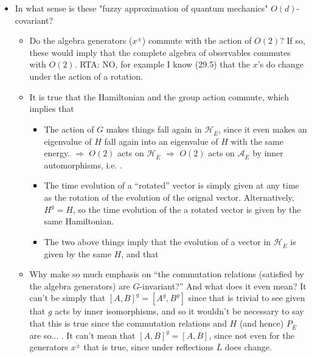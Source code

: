 \documentclass{article}
\newcommand{\cut}[1]{\overline{#1}}
\begin{document}
    \begin{itemize}

    \item In what sense is these "fuzzy approximation of quantum mechanics" $O(d)$-covariant?
    
        \begin{itemize}
            
        \item Do the algebra generators ($x^\pm$) commute with the action of $O(2)$? If so, these would imply that the complete algebra of observables commutes with $O(2)$. RTA: NO, for example I know (29.5) that the $x$'s do change under the action of a rotation.
        
        \item {} It is true that the Hamiltonian and the group action commute, which implies that
        
            \begin{itemize}
                
            \item The action of $G$ makes things fall again in $\mathcal H_{\cut E}$, since it even makes an eigenvalue of $H$ fall again into an eigenvalue of $H$ with the same energy.
$\Rightarrow$ $O(2)$ acts on $\mathcal H_{\cut E}$ $\Rightarrow$ $O(2)$ acts on $\mathcal A_{\cut E}$ by inner automorphisms, i.e. .         
            \item The time evolution of a ``rotated'' vector is simply given at any time as the rotation of the evolution of the orignal vector. Alternatively, $H^g = H$, so the time evolution of the a rotated vector is given by the same Hamiltonian.
            
            \item The two above things imply that the evolution of a vector in $\mathcal H_{\cut E}$ is given by the same $H$, and that 
            
                
            \end{itemize}
            
        \item Why make so much emphasis on ``the commutation relations (satisfied by the algebra generators) are $G$-invariant?'' And what does it even mean? {\tiny It can't be simply that $[A, B]^g = [A^g, B^g]$ since that is trivial to see given that $g$ acts by inner isomorphisms, and so it wouldn't be necessary to say that this is true since the commutation relations and $H$ (and hence) $P_{\cut E}$ are so... . It can't mean that $[A, B]^g = [A, B]$, since not even for the generators $\cut{x^\pm}$ that is true, since under reflections $\cut L$ does change.
        }  
        

\end{itemize}
\end{itemize}
\end{document}
